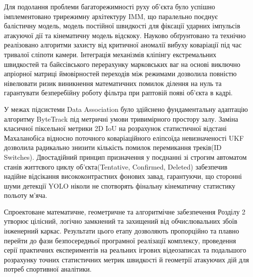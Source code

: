 \begin{unnumbered}
Для подолання проблеми багаторежимності руху об'єкта було успішно імплементовано трирежимну архітектуру \gls{IMM}, що
паралельно поєднує балістичну модель, модель постійної швидкості для фіксації ударних імпульсів атакуючої дії та кінематичну
модель відскоку. Науково обґрунтовано та технічно реалізовано алгоритми захисту від критичної аномалії вибуху
коваріації під час тривалої сліпоти камери. Інтеграція механізмів кліпінгу екстремальних швидкостей та байєсівського
перерахунку марковських ваг на основі виключно апріорної матриці ймовірностей переходів між режимами дозволила повністю
нівелювати ризик виникнення математичних помилок ділення на нуль та гарантувати безперебійну роботу фільтра при
раптовій появі об'єкта в кадрі.

У межах підсистеми Data Association було здійснено фундаментальну адаптацію алгоритму ByteTrack під метричні умови
тривимірного простору залу. Заміна класичної піксельної метрики 2D \gls{IoU} на розрахунок статистичної відстані Махаланобіса
відносно поточного коваріаційного еліпсоїда невизначеності \gls{UKF} дозволила радикально знизити кількість помилок
перемикання треків(ID Switches). Двостадійний принцип призначення у поєднанні зі строгим автоматом станів життєвого
циклу об'єкта(Tentative, Confirmed, Deleted) забезпечив надійне відсікання висококонтрастних фонових завад,
гарантуючи, що сторонні шуми детекції \gls{YOLO} ніколи не спотворять фінальну кінематичну статистику польоту м'яча.

Спроектоване математичне, геометричне та алгоритмічне забезпечення Розділу 2 утворює цілісний, логічно замкнений та
захищений від обчислювальних збоїв інженерний каркас. Результати цього етапу дозволяють пропорційно та плавно перейти
до фази безпосередньої програмної реалізації комплексу, проведення серії практичних експериментів на реальних ігрових
відеозаписах та подальшого розрахунку точних статистичних метрик швидкості й геометрії атакуючих дій для потреб спортивної
аналітики.

\end{unnumbered}
